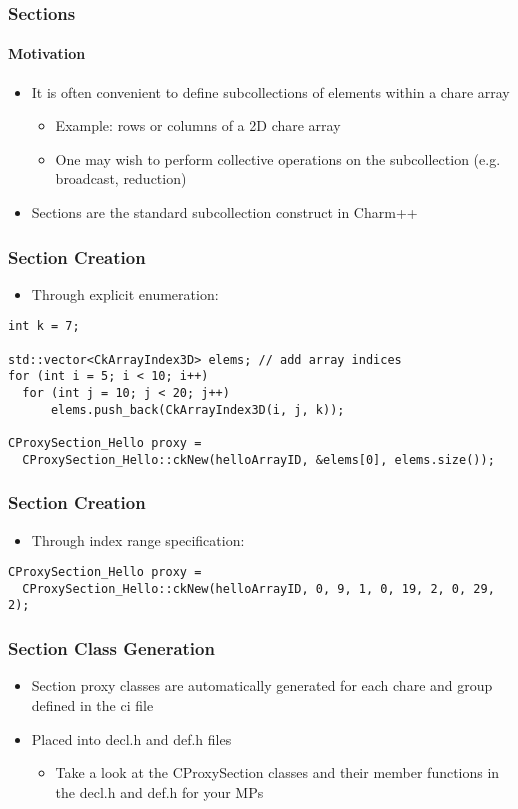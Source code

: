 \begin{frame}[fragile]
\frametitle{Sections}
\framesubtitle{Motivation}
\begin{itemize}
 \item It is often convenient to define subcollections of elements within a
   chare array
   \begin{itemize}
   \item Example: rows or columns of a 2D chare array
   \item One may wish to perform collective operations on the subcollection
     (e.g. broadcast, reduction)
   \end{itemize}
 \item Sections are the standard subcollection construct in Charm++
\end{itemize}
\end{frame}

\begin{frame}[fragile]
\frametitle{Section Creation}
\begin{itemize}
 \item Through explicit enumeration:
\end{itemize}

\begin{lstlisting}
int k = 7;

std::vector<CkArrayIndex3D> elems; // add array indices
for (int i = 5; i < 10; i++)
  for (int j = 10; j < 20; j++)
      elems.push_back(CkArrayIndex3D(i, j, k));

CProxySection_Hello proxy =
  CProxySection_Hello::ckNew(helloArrayID, &elems[0], elems.size());
\end{lstlisting}
\end{frame}

\begin{frame}[fragile]
\frametitle{Section Creation}
\begin{itemize}
 \item Through index range specification:
\end{itemize}

\begin{lstlisting}
CProxySection_Hello proxy =
  CProxySection_Hello::ckNew(helloArrayID, 0, 9, 1, 0, 19, 2, 0, 29, 2);
\end{lstlisting}
\end{frame}

\begin{frame}[fragile]
\frametitle{Section Class Generation}
\begin{itemize}
 \item Section proxy classes are automatically generated for each chare and group defined in the ci file
 \item Placed into decl.h and def.h files
   \begin{itemize}
   \item Take a look at the CProxySection classes and their member functions in
     the decl.h and def.h for your MPs
   \end{itemize}
\end{itemize}
\end{frame}

